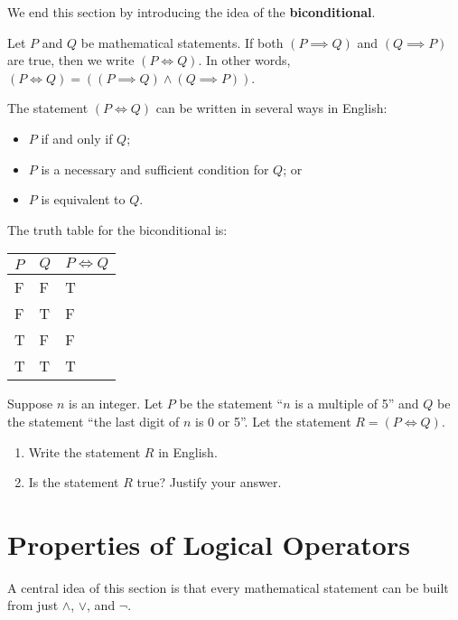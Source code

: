 We end this section by introducing the idea of the \textbf{biconditional}.
\begin{definition}
    Let $P$ and $Q$ be mathematical statements. If both $(P \implies Q)$ and $(Q \implies P)$ are true, then we write $(P \iff Q)$. In other words, $(P \iff Q) = ((P \implies Q) \land (Q \implies P))$.
\end{definition}
\begin{remark}
    The statement $(P \iff Q)$ can be written in several ways in English:
    \begin{itemize}
        \item $P$ if and only if $Q$;
        \item $P$ is a necessary and sufficient condition for $Q$; or
        \item $P$ is equivalent to $Q$.
    \end{itemize}
\end{remark}

The truth table for the biconditional is:
\begin{table}[h]
    \centering
    \begin{tabular}{|l|l||l|}
        \hline
        $P$ & $Q$ & $P\iff Q$ \\ \hline
        F   & F   & T         \\ \hline
        F   & T   & F         \\ \hline
        T   & F   & F         \\ \hline
        T   & T   & T         \\ \hline
    \end{tabular}
\end{table}

\begin{exercise}
    Suppose $n$ is an integer. Let $P$ be the statement ``$n$ is a multiple of 5'' and $Q$ be the statement ``the last digit of $n$ is 0 or 5''. Let the statement $R = (P \iff Q)$.
    \begin{enumerate}[label=(\roman*)]
        \item Write the statement $R$ in English.
        \item Is the statement $R$ true? Justify your answer.
    \end{enumerate}
\end{exercise}

\section{Properties of Logical Operators}
A central idea of this section is that every mathematical statement can be built from just $\land$, $\lor$, and $\lnot$.

